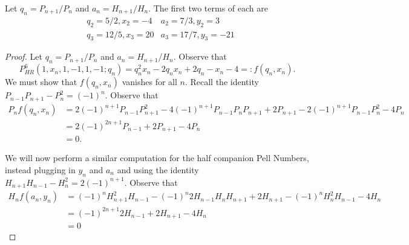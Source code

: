 \documentclass[11 pt]{amsart}
\begin{document}
    
    \begin{example} Let $q_n = P_{n+1}/P_n$ and $a_n = H_{n + 1} / H_n$. The first two terms of each are
    \begin{align*}
        & q_2 = 5/2, x_2 = -4 &  a_2 = 7/3, y_2 = 3 \\
        & q_3 = 12/5, x_3 = 20 &  a_3 = 17/7, y_3 = -21
    \end{align*}
    \end{example}

\begin{proof}
         Let $q_n = P_{n+1}/P_n$ and $a_n = H_{n + 1} / H_n$. Observe that \[P_{HR}^6(1, x_n, 1, -1, 1 ,-1; q_n) = q_{n}^2x_n - 2q_nx_n + 2q_n - x_n - 4 =: f(q_n, x_n).\] We must show that $f(q_n, x_n)$ vanishes for all $n$. Recall the identity $P_{n-1}P_{n+1} - P_{n}^2 = (-1)^n$. Observe that
        \begin{align*}
		P_nf(q_n, x_n) & = 2(-1)^{n + 1} P_{n-1}P_{n+1}^2 - 4(-1)^{n + 1} P_{n-1}P_nP_{n+1} + 2P_{n+1} - 2(-1)^{n + 1} P_{n-1}P_n^2 - 4P_n \\
            & = 2(-1)^{2n + 1}P_{n-1} + 2P_{n + 1} - 4P_n \\
            & = 0.
        \end{align*}

        We will now perform a similar computation for the half companion Pell Numbers, instead plugging in $y_n$ and $a_n$ and using the identity $H_{n+1}H_{n-1} - H_n^2 = 2 (-1)^{n+1}$. Observe that
        \begin{align*}
            H_nf(a_n, y_n) & = (-1)^n H_{n+1}^2 H_{n-1}-(-1)^n 2 H_{n-1}H_n H_{n+1} + 2H_{n+1} - (-1)^n H_n^2 H_{n-1} - 4H_n \\
            & = (-1)^{2n + 1}2 H_{n-1} + 2H_{n+1} - 4H_n \\
            & = 0
        \end{align*}
\end{proof}


\end{document}
